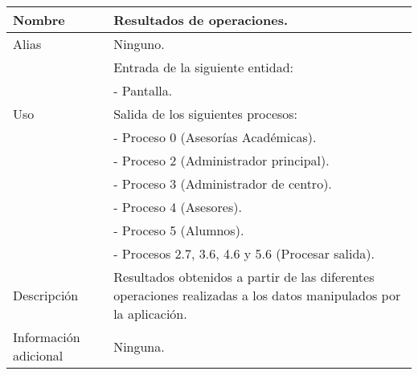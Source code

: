 \begin{center}
  \begin{tabular}{| l | p{9cm} |}
    \hline
    Nombre & \textbf{Resultados de operaciones}.\\
    \hline
    Alias & Ninguno.\\
    \hline
    \multirow{5}{*}{Uso} & Entrada de la siguiente entidad:\\
                         & - Pantalla.\\
                         & Salida de los siguientes procesos:\\
                         & - Proceso 0 (Asesorías Académicas).\\
                         & - Proceso 2 (Administrador principal).\\
                         & - Proceso 3 (Administrador de centro).\\
                         & - Proceso 4 (Asesores).\\
                         & - Proceso 5 (Alumnos).\\
                         & - Procesos 2.7, 3.6, 4.6 y 5.6 (Procesar salida).\\
    \hline
    Descripción & Resultados obtenidos a partir de las diferentes operaciones
                  realizadas a los datos manipulados por la aplicación.\\
    \hline
    Información adicional & Ninguna.\\
    \hline
  \end{tabular}
\end{center}
